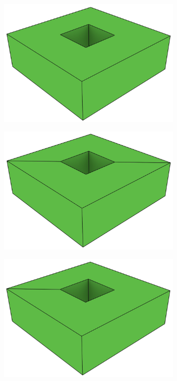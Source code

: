 \begin{figure}
\centering
\begin{subfigure}[b]{0.3\linewidth}
\includegraphics[width=\linewidth]{figs/hole}
\caption{}%
\label{subfig:hole}
\end{subfigure}
\quad
\begin{subfigure}[b]{0.3\linewidth}
\includegraphics[width=\linewidth]{figs/hole-split}
\caption{}%
\label{subfig:hole-split}
\end{subfigure}
\begin{subfigure}[b]{0.3\linewidth}
\includegraphics[width=\linewidth]{figs/hole-bridge}

\end{subfigure}
\end{figure}
